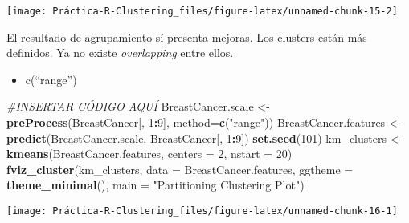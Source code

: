 \documentclass[]{article}
\newenvironment{Shaded}{\begin{snugshade}}{\end{snugshade}}
\newcommand{\CommentTok}[1]{\textcolor[rgb]{0.56,0.35,0.01}{\textit{#1}}}
\newcommand{\DataTypeTok}[1]{\textcolor[rgb]{0.13,0.29,0.53}{#1}}
\newcommand{\DecValTok}[1]{\textcolor[rgb]{0.00,0.00,0.81}{#1}}
\newcommand{\KeywordTok}[1]{\textcolor[rgb]{0.13,0.29,0.53}{\textbf{#1}}}
\newcommand{\NormalTok}[1]{#1}
\newcommand{\OperatorTok}[1]{\textcolor[rgb]{0.81,0.36,0.00}{\textbf{#1}}}
\newcommand{\StringTok}[1]{\textcolor[rgb]{0.31,0.60,0.02}{#1}}
\providecommand{\tightlist}{%
  \setlength{\itemsep}{0pt}\setlength{\parskip}{0pt}}
\begin{document}
\begin{center}\texttt{[image: Práctica-R-Clustering\_files/figure-latex/unnamed-chunk-15-2]} \end{center}

El resultado de agrupamiento sí presenta mejoras. Los clusters están más
definidos. Ya no existe \emph{overlapping} entre ellos.

\begin{itemize}
\tightlist
\item
  c(``range'')
\end{itemize}

\begin{Shaded}
\begin{Highlighting}[]
\CommentTok{#INSERTAR CÓDIGO AQUÍ}
\NormalTok{BreastCancer.scale <-}\StringTok{ }\KeywordTok{preProcess}\NormalTok{(BreastCancer[, }\DecValTok{1}\OperatorTok{:}\DecValTok{9}\NormalTok{], }\DataTypeTok{method=}\KeywordTok{c}\NormalTok{(}\StringTok{"range"}\NormalTok{))}
\NormalTok{BreastCancer.features <-}\StringTok{ }\KeywordTok{predict}\NormalTok{(BreastCancer.scale, BreastCancer[, }\DecValTok{1}\OperatorTok{:}\DecValTok{9}\NormalTok{])}
\KeywordTok{set.seed}\NormalTok{(}\DecValTok{101}\NormalTok{)}
\NormalTok{km_clusters <-}\StringTok{ }\KeywordTok{kmeans}\NormalTok{(BreastCancer.features, }\DataTypeTok{centers =} \DecValTok{2}\NormalTok{, }\DataTypeTok{nstart =} \DecValTok{20}\NormalTok{)}
\KeywordTok{fviz_cluster}\NormalTok{(km_clusters, }\DataTypeTok{data =}\NormalTok{ BreastCancer.features,}
             \DataTypeTok{ggtheme =} \KeywordTok{theme_minimal}\NormalTok{(),}
             \DataTypeTok{main =} \StringTok{"Partitioning Clustering Plot"}\NormalTok{)}
\end{Highlighting}
\end{Shaded}

\begin{center}\texttt{[image: Práctica-R-Clustering\_files/figure-latex/unnamed-chunk-16-1]} \end{center}

\begin{Shaded}
\end{Shaded}
\end{document}

